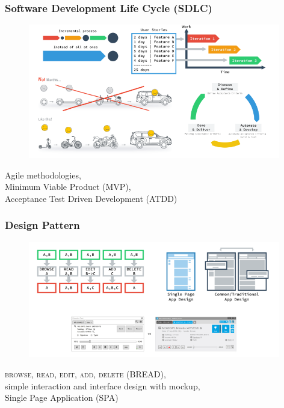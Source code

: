 \documentclass[10pt, compress]{beamer}
\begin{document}
\begin{frame}[fragile]
  \frametitle{Software Development Life Cycle (SDLC)}
  \centering

  \begin{figure}[ht]
    \vspace{-1cm}
    \includegraphics[width=11cm]{include/literature-sdlc.png}
  \end{figure}

  \alert{Agile} methodologies,\\
  Minimum Viable Product (\alert{MVP}),\\
  Acceptance Test Driven Development (\alert{ATDD})

\end{frame}


\begin{frame}[fragile]
  \frametitle{Design Pattern}
  \centering

  \begin{figure}[ht]
    \vspace{-1cm}
    \includegraphics[width=11cm]{include/literature-design-pattern.png}
  \end{figure}

  \textsc{browse, read, edit, add, delete} (\alert{BREAD}),\\
  simple interaction and interface design with mockup,\\
  Single Page Application (\alert{SPA})

\end{frame}
\end{document}
